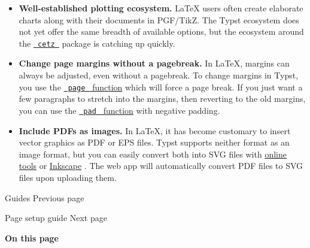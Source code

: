 \begin{itemize}
\item
  \textbf{Well-established plotting ecosystem.} LaTeX users often create
  elaborate charts along with their documents in PGF/TikZ. The Typst
  ecosystem does not yet offer the same breadth of available options,
  but the ecosystem around the
  \href{https://github.com/cetz-package/cetz}{\texttt{\ cetz\ }} package
  is catching up quickly.
\item
  \textbf{Change page margins without a pagebreak.} In LaTeX, margins
  can always be adjusted, even without a pagebreak. To change margins in
  Typst, you use the
  \href{/docs/reference/layout/page/}{\texttt{\ page\ } function} which
  will force a page break. If you just want a few paragraphs to stretch
  into the margins, then reverting to the old margins, you can use the
  \href{/docs/reference/layout/pad/}{\texttt{\ pad\ } function} with
  negative padding.
\item
  \textbf{Include PDFs as images.} In LaTeX, it has become customary to
  insert vector graphics as PDF or EPS files. Typst supports neither
  format as an image format, but you can easily convert both into SVG
  files with \href{https://cloudconvert.com/pdf-to-svg}{online tools} or
  \href{https://inkscape.org/}{Inkscape} . The web app will
  automatically convert PDF files to SVG files upon uploading them.
\end{itemize}

\href{/docs/guides/}{\pandocbounded{}}

{ Guides } { Previous page }

\href{/docs/guides/page-setup-guide/}{\pandocbounded{}}

{ Page setup guide } { Next page }

\textbf{On this page}

